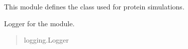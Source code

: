 \documentclass[letterpaper,10pt,english]{sphinxmanual}
\begin{document}
\sphinxAtStartPar
This module defines the  class used for protein simulations.

\begin{fulllineitems}
\label{\detokenize{src:src.Protein_Class.logger}}
\pysigstartsignatures
{}
\pysigstopsignatures
\sphinxAtStartPar
Logger for the module.
\begin{quote}\begin{description}
\sphinxAtStartPar
logging.Logger

\end{description}\end{quote}

\end{fulllineitems}

\end{document}
